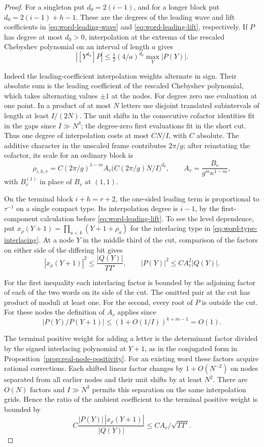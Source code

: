\begin{proof}
For a singleton put \(d_0=2(i-1)\), and for a longer block put
\(d_0=2(i-1)+h-1\). These are the degrees of the leading wave
and lift coefficients in \eqref{eq:word-leading-wave} and
\eqref{eq:word-leading-lift}, respectively. If \(P\) has degree
at most \(d_0>0\), interpolation at the extrema of the rescaled
Chebyshev polynomial on an interval of length \(a\) gives
\[
 |[Y^{d_0}]P|\le \tfrac12(4/a)^{d_0}
                       \max_{Y}|P(Y)|.
\]


Indeed the leading-coefficient interpolation weights alternate in
sign. Their absolute sum is the leading coefficient of the rescaled
Chebyshev polynomial, which takes alternating values \(\pm1\)
at the nodes. For degree zero use evaluation at one point.
In a product of at most \(N\) letters use disjoint translated
subintervals of length at least \(I/(2N)\). The unit shifts in the
consecutive cofactor identities fit in the gaps since
\(I\gg N^3\); the degree-zero first evaluations fit in the short cut.
Thus one degree of interpolation costs at most \(C N/I\), with
\(C\) absolute. The additive character in the unscaled frame
contributes \(2\pi/g\); after reinstating the cofactor, its scale
for an ordinary block is
\[
 \rho_{i,h,v}
 =C(2\pi/g)^{1-m} A_v
              \bigl(C(2\pi/g)N/I\bigr)^{d_0},\qquad
 A_v=\frac{B_v}{g^m\kappa^{1-m}} ,
\]
with \(B_v^{(1)}\) in place of \(B_v\) at \((1,1)\).


On the terminal block \(i+h=r+2\), the one-sided leading term is proportional to \(\tau^{-1}\) on a single compact type. Its interpolation degree is \(i-1\), by the first-component calculation before \eqref{eq:word-leading-lift}. To see the level dependence, put \(x_\rho(Y+1)=\prod_{a<k}(Y+1+\rho_a)\) for the interlacing type in \eqref{eq:word-type-interlacing}. At a node \(Y\) in the middle third of the cut, comparison of the factors on either side of the differing bit gives
\[
  |x_\rho(Y+1)|^2\le \frac{|Q(Y)|}{TT'},\qquad
  |P(Y)|^2\le C A_v^2|Q(Y)|.
\]


For the first inequality each interlacing factor is bounded by the adjoining factor of each of the two words on its side of the cut. The omitted pair at the cut has product of moduli at least one. For the second, every root of \(P\) is outside the cut. For these nodes the definition of \(A_v\) applies since
\[
      |P(Y)/P(Y+1)|\le(1+O(1/I))^{k+m-1}=O(1).
\]

The terminal positive weight for adding a letter is the determinant factor divided by the signed interlacing polynomial at \(Y+1\), as in the conjugated form in Proposition~\ref{prop:real-node-positivity}. For an existing word these factors acquire rational corrections. Each shifted linear factor changes by \(1+O(N^{-2})\) on nodes separated from all earlier nodes and their unit shifts by at least \(N^2\). There are \(O(N)\) factors and \(I\gg N^3\) permits this separation on the same interpolation grids. Hence the ratio of the ambient coefficient to the terminal positive weight is bounded by
\[
        C\frac{|P(Y)|\,|x_\rho(Y+1)|}{|Q(Y)|}
                         \le C A_v/\sqrt{TT'} .
\]


\end{proof}
